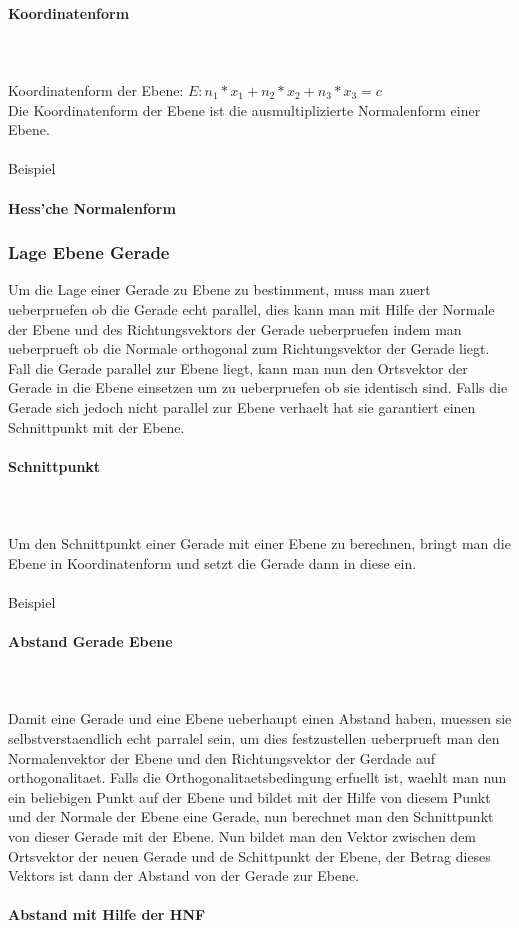 \documentclass[a4paper]{article} %
\begin{document}
	\paragraph{Koordinatenform}
		\hspace{0 cm} \\ \noindent \\
		Koordinatenform der Ebene: $E: n_1*x_1+n_2*x_2+n_3*x_3=c$\\
		Die Koordinatenform der Ebene ist die ausmultiplizierte Normalenform einer Ebene.
		\\\\Beispiel
	\paragraph{Hess'che Normalenform}
	\subsubsection{Lage Ebene Gerade}
	Um die Lage einer Gerade zu Ebene zu bestimment, muss man zuert ueberpruefen ob die Gerade echt parallel, dies kann man mit Hilfe der Normale der Ebene und des Richtungsvektors der Gerade ueberpruefen indem man ueberprueft ob die Normale orthogonal zum Richtungsvektor der Gerade liegt.
	Fall die Gerade parallel zur Ebene liegt, kann man nun den Ortsvektor der Gerade in die Ebene einsetzen um zu ueberpruefen ob sie identisch sind.
	Falls die Gerade sich jedoch nicht parallel zur Ebene verhaelt hat sie garantiert einen Schnittpunkt mit der Ebene. 
	\paragraph{Schnittpunkt}
		\hspace{0 cm} \\ \noindent \\
		Um den Schnittpunkt einer Gerade mit einer Ebene zu berechnen, bringt man die Ebene in Koordinatenform und setzt die Gerade dann in diese ein.
		\\\\Beispiel
	\paragraph{Abstand Gerade Ebene}
	\hspace{0 cm} \\ \noindent \\
	Damit eine Gerade und eine Ebene ueberhaupt einen Abstand haben, muessen sie selbstverstaendlich echt parralel sein,
	um dies festzustellen ueberprueft man den Normalenvektor der Ebene und den Richtungsvektor der Gerdade auf orthogonalitaet.
	Falls die Orthogonalitaetsbedingung erfuellt ist, waehlt man nun ein beliebigen Punkt auf der Ebene und bildet mit der Hilfe von
	diesem Punkt und der Normale der Ebene eine Gerade, nun berechnet man den Schnittpunkt von dieser Gerade mit der Ebene.
	Nun bildet man den Vektor zwischen dem Ortsvektor der neuen Gerade und de Schittpunkt der Ebene, der Betrag dieses Vektors
	ist dann der Abstand von der Gerade zur Ebene.\\\\
	\textbf{Abstand mit Hilfe der HNF}
\end{document}
